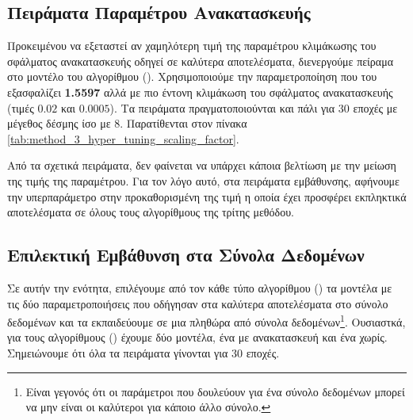 \subsection{Πειράματα Παραμέτρου Ανακατασκευής}

Προκειμένου να εξεταστεί αν χαμηλότερη τιμή της παραμέτρου κλιμάκωσης του σφάλματος ανακατασκευής οδηγεί σε καλύτερα αποτελέσματα, διενεργούμε πείραμα στο μοντέλο του αλγορίθμου (). Χρησιμοποιούμε την παραμετροποίηση που του εξασφαλίζει  \textbf{1.5597} αλλά με πιο έντονη κλιμάκωση του σφάλματος ανακατασκευής (τιμές $0.02$ και $0.0005$). Τα πειράματα πραγματοποιούνται και πάλι για 30 εποχές με μέγεθος δέσμης ίσο με 8. Παρατίθενται στον πίνακα \ref{tab:method_3_hyper_tuning_scaling_factor}.


\begin{table}[h]
    \begin{center}
    \end{center}
    \caption[]{\label{tab:method_3_hyper_tuning_scaling_factor}Αποτελέσματα πειραμάτων για την εύρεση της βέλτιστης τιμής του παράγοντα κλιμάκωσης του σφάλματος ανακατασκευής στο σύνολο δεδομένων . Τα πειράματα πραγματοποιήθηκαν για 30 εποχές με μέγεθος δέσμης ίσο με 8.} 
\end{table}

Από τα σχετικά πειράματα, δεν φαίνεται να υπάρχει κάποια βελτίωση με την μείωση της τιμής της παραμέτρου. Για τον λόγο αυτό, στα πειράματα εμβάθυνσης, αφήνουμε την υπερπαράμετρο στην προκαθορισμένη της τιμή η οποία έχει προσφέρει εκπληκτικά αποτελέσματα σε όλους τους αλγορίθμους της τρίτης μεθόδου.

\subsection{Επιλεκτική Εμβάθυνση στα Σύνολα Δεδομένων}
Σε αυτήν την ενότητα, επιλέγουμε από τον κάθε τύπο αλγορίθμου () τα μοντέλα με τις δύο παραμετροποιήσεις που οδήγησαν στα καλύτερα αποτελέσματα στο σύνολο δεδομένων  και τα εκπαιδεύουμε σε μια πληθώρα από σύνολα δεδομένων\footnote{Είναι γεγονός ότι οι παράμετροι που δουλεύουν για ένα σύνολο δεδομένων μπορεί να μην είναι οι καλύτεροι για κάποιο άλλο σύνολο.}. Ουσιαστκά, για τους αλγορίθμους () έχουμε δύο μοντέλα, ένα με ανακατασκευή και ένα χωρίς. Σημειώνουμε ότι όλα τα πειράματα γίνονται για 30 εποχές.\par

